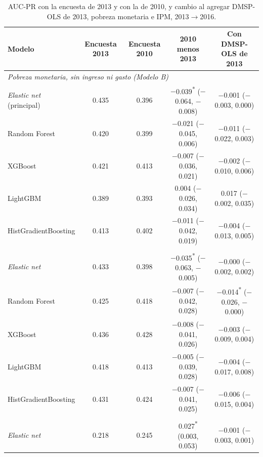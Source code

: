 \begin{table}[H]
  \centering
  \caption{AUC-PR con la encuesta de 2013 y con la de 2010, y cambio al agregar DMSP-OLS
  de 2013, pobreza monetaria e IPM, 2013$\to$2016.}
  \label{tab:robustez_desactualizada}
  \footnotesize
  \setlength{\tabcolsep}{4pt}
  \begin{tabular}{l cc cc}
    \toprule
    \textbf{Modelo} & \textbf{Encuesta 2013} & \textbf{Encuesta 2010} & \textbf{2010 menos 2013} & \textbf{Con DMSP-OLS de 2013} \\
    \midrule
    \multicolumn{5}{l}{\textit{Pobreza monetaria, sin ingreso ni gasto (Modelo B)}} \\
    \quad \emph{Elastic net} (principal) & 0.435 & 0.396 & $-$0.039\textsuperscript{*} ($-$0.064, $-$0.008) & $-$0.001 ($-$0.003, 0.000) \\
    \quad Random Forest & 0.420 & 0.399 & $-$0.021 ($-$0.045, 0.006) & $-$0.011 ($-$0.022, 0.003) \\
    \quad XGBoost & 0.421 & 0.413 & $-$0.007 ($-$0.036, 0.021) & $-$0.002 ($-$0.010, 0.006) \\
    \quad LightGBM & 0.389 & 0.393 & 0.004 ($-$0.026, 0.034) & 0.017 ($-$0.002, 0.035) \\
    \quad HistGradientBoosting & 0.413 & 0.402 & $-$0.011 ($-$0.042, 0.019) & $-$0.004 ($-$0.013, 0.005) \\
    \addlinespace
    \multicolumn{5}{l}{\textit{Pobreza monetaria, con ingreso y gasto (Modelo A)}} \\
    \quad \emph{Elastic net} & 0.433 & 0.398 & $-$0.035\textsuperscript{*} ($-$0.063, $-$0.005) & $-$0.000 ($-$0.002, 0.002) \\
    \quad Random Forest & 0.425 & 0.418 & $-$0.007 ($-$0.042, 0.028) & $-$0.014\textsuperscript{*} ($-$0.026, $-$0.000) \\
    \quad XGBoost & 0.436 & 0.428 & $-$0.008 ($-$0.041, 0.026) & $-$0.003 ($-$0.009, 0.004) \\
    \quad LightGBM & 0.418 & 0.413 & $-$0.005 ($-$0.039, 0.028) & $-$0.004 ($-$0.017, 0.008) \\
    \quad HistGradientBoosting & 0.431 & 0.424 & $-$0.007 ($-$0.041, 0.025) & $-$0.006 ($-$0.015, 0.004) \\
    \addlinespace
    \multicolumn{5}{l}{\textit{IPM, sin ingreso ni gasto (Modelo B)}} \\
    \quad \emph{Elastic net} & 0.218 & 0.245 & 0.027\textsuperscript{*} (0.003, 0.053) & $-$0.001 ($-$0.003, 0.001) \\

\end{tabular}
\end{table}
